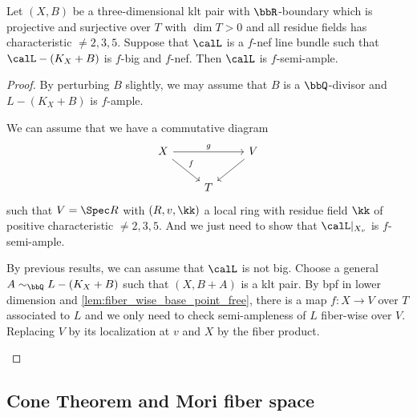    \begin{theorem}\label{thm:base_point_free}
        Let \((X,B)\) be a three-dimensional klt pair with \(\bbR\)-boundary which is projective and surjective over \(T\) with \(\dim T >0\) and all residue fields has characteristic \(\neq 2,3,5\).
        Suppose that \(\calL\) is a \(f\)-nef line bundle such that \(\calL - (K_X + B)\) is \(f\)-big and \(f\)-nef.
        Then \(\calL\) is \(f\)-semi-ample.
    \end{theorem}
    \begin{proof}
        By perturbing \(B\) slightly, we may assume that \(B\) is a \(\bbQ\)-divisor and \(L-(K_X+B)\) is \(f\)-ample.
        
        \begin{step}
            We can assume that we have a commutative diagram
            \[ \begin{tikzcd}
                X \arrow[rr, "g"] \arrow[dr, "f"] & & V \arrow[ld] \\
                & T & 
            \end{tikzcd} \]
            such that \(V = \Spec R\) with \((R,v,\kk)\) a local ring with residue field \(\kk\) of positive characteristic \(\neq 2,3,5\).
            And we just need to show that \(\calL|_{X_v}\) is \(f\)-semi-ample.
        \end{step}
        \begin{subproof}
            By previous results, we can assume that \(\calL\) is not big.
            Choose a general \(A \sim_{\bbQ} L - (K_X + B)\) such that \((X,B+A)\) is a klt pair.
            By bpf in lower dimension and \cref{lem:fiber_wise_base_point_free}, there is a map \(f: X \to V\) over \(T\) associated to \(L\) and we only need to check semi-ampleness of \(L\) fiber-wise over \(V\).
            Replacing \(V\) by its localization at \(v\) and \(X\) by the fiber product.
        \end{subproof}

        \begin{step}
            
        \end{step}


    \end{proof}

\subsection{Cone Theorem and Mori fiber space}

